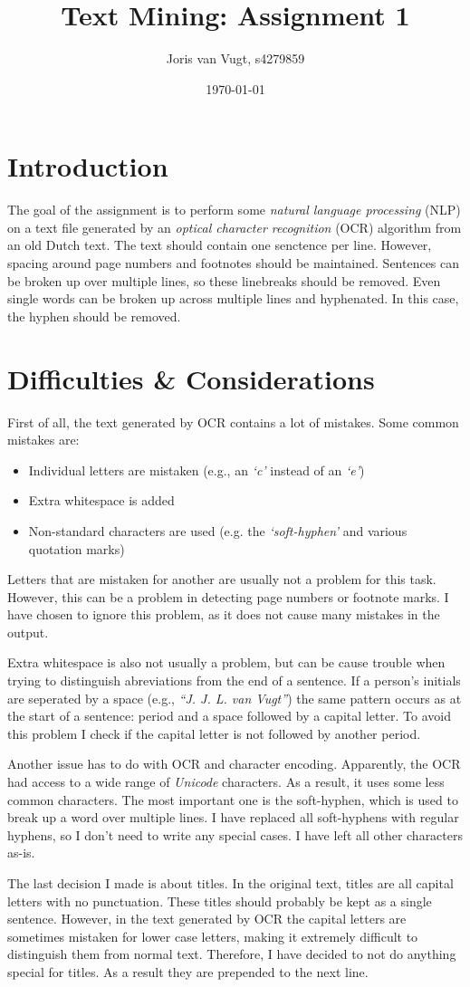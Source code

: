\documentclass{article}
\title{Text Mining: Assignment 1}
\author{Joris van Vugt, s4279859}
\date{\today}
\begin{document}
\maketitle
\section{Introduction}
The goal of the assignment is to perform some \emph{natural language processing} (NLP) on a text file generated by an \emph{optical character recognition} (OCR) algorithm from an old Dutch text. The text should contain one senctence per line. However, spacing around page numbers and footnotes should be maintained. Sentences can be broken up over multiple lines, so these linebreaks should be removed. Even single words can be broken up across multiple lines and hyphenated. In this case, the hyphen should be removed.

\section{Difficulties \& Considerations}
First of all, the text generated by OCR contains a lot of mistakes. Some common mistakes are:
\begin{itemize}
\item Individual letters are mistaken (e.g., an \emph{`c'} instead of an \emph{`e'})
\item Extra whitespace is added
\item Non-standard characters are used (e.g. the \emph{`soft-hyphen'} and various quotation marks)
\end{itemize}
\par Letters that are mistaken for another are usually not a problem for this task. However, this can be a problem in detecting page numbers or footnote marks. I have chosen to ignore this problem, as it does not cause many mistakes in the output.
\par Extra whitespace is also not usually a problem, but can be cause trouble when trying to distinguish abreviations from the end of a sentence. If a person's initials are seperated by a space (e.g., \emph{``J. J. L. van Vugt''}) the same pattern occurs as at the start of a sentence: period and a space followed by a capital letter. To avoid this problem I check if the capital letter is not followed by another period.
\par Another issue has to do with OCR and character encoding. Apparently, the OCR had access to a wide range of \emph{Unicode} characters. As a result, it uses some less common characters. The most important one is the soft-hyphen, which is used to break up a word over multiple lines. I have replaced all soft-hyphens with regular hyphens, so I don't need to write any special cases. I have left all other characters as-is.
\par The last decision I made is about titles. In the original text, titles are all capital letters with no punctuation. These titles should probably be kept as a single sentence. However, in the text generated by OCR the capital letters are sometimes mistaken for lower case letters, making it extremely difficult to distinguish them from normal text. Therefore, I have decided to not do anything special for titles. As a result they are prepended to the next line.
\end{document}
